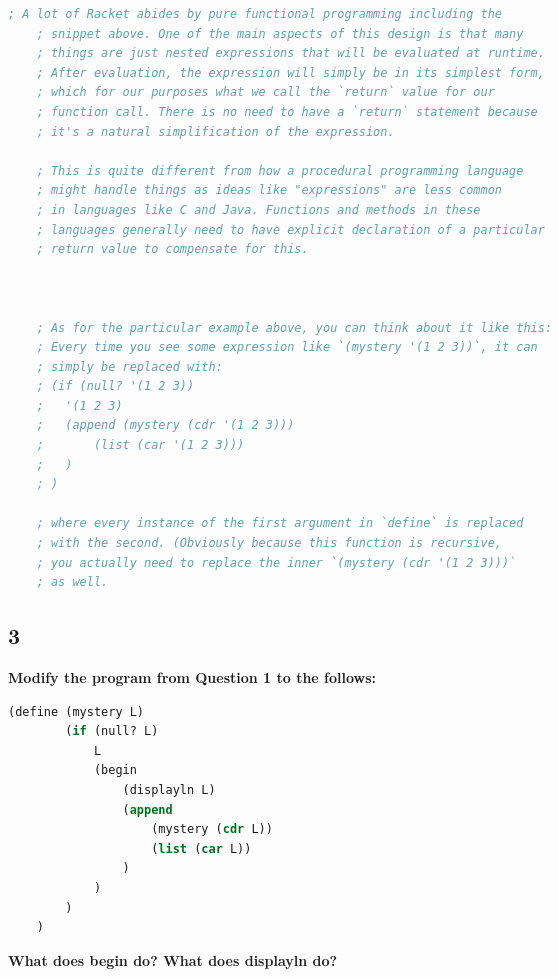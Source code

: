 \documentclass{article}
\begin{document}
\begin{lstlisting}[language=lisp,style=redStyle]
    ; A lot of Racket abides by pure functional programming including the
    ; snippet above. One of the main aspects of this design is that many
    ; things are just nested expressions that will be evaluated at runtime.
    ; After evaluation, the expression will simply be in its simplest form,
    ; which for our purposes what we call the `return` value for our
    ; function call. There is no need to have a `return` statement because
    ; it's a natural simplification of the expression. 
    
    ; This is quite different from how a procedural programming language 
    ; might handle things as ideas like "expressions" are less common
    ; in languages like C and Java. Functions and methods in these 
    ; languages generally need to have explicit declaration of a particular
    ; return value to compensate for this. 



    ; As for the particular example above, you can think about it like this:
    ; Every time you see some expression like `(mystery '(1 2 3))`, it can 
    ; simply be replaced with:
    ; (if (null? '(1 2 3))
    ;   '(1 2 3)
    ;   (append (mystery (cdr '(1 2 3)))
    ;       (list (car '(1 2 3)))
    ;   )
    ; )

    ; where every instance of the first argument in `define` is replaced 
    ; with the second. (Obviously because this function is recursive,
    ; you actually need to replace the inner `(mystery (cdr '(1 2 3)))`
    ; as well. 
\end{lstlisting}

\subsection*{3}
\begin{adjustwidth}{2em}{0em}
    \textbf{Modify the program from Question 1 to the follows:} 
\end{adjustwidth}

\begin{lstlisting}[language=lisp]
    (define (mystery L) 
        (if (null? L)
            L
            (begin 
                (displayln L)
                (append 
                    (mystery (cdr L))
                    (list (car L))
                )
            )
        )
    )
\end{lstlisting}

\begin{adjustwidth}{2em}{0em}
    \textbf{What does begin do? What does displayln do?} 
\end{adjustwidth}
\end{document}
